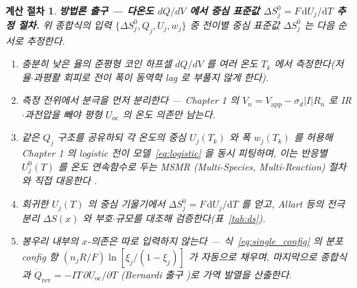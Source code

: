 \documentclass[11pt,a4paper]{article}
\newtheorem*{procedurebox}{계산 절차}
\newcommand{\dd}{\mathrm{d}}
\newcommand{\rev}{\mathrm{rev}}
\newcommand{\oc}{\mathrm{oc}}
\begin{document}
\begin{procedurebox}
\textbf{방법론 출구 — 다온도 $dQ/dV$ 에서 중심 표준값 $\Delta S^0_j=F\,\dd U_j/\dd T$ 추정 절차.} 위 종합식의 입력
$\{\Delta S^0_j,Q_j,U_j,w_j\}$ 중 전이별 중심 표준값 $\Delta S^0_j$ 는 다음 순서로 추정한다.
\begin{enumerate}[leftmargin=1.8em,itemsep=2pt,topsep=2pt]
\item 충분히 낮은 율의 준평형 코인 하프셀 $dQ/dV$ 를 여러 온도 $T_k$ 에서 측정한다(저율$\cdot$과평활 회피로
전이 폭이 동역학 lag 로 부풀지 않게 한다).
\item 측정 전위에서 분극을 먼저 분리한다 — Chapter 1 의 $V_n=V_\mathrm{app}-\sigma_d|I|R_n$ 로 IR$\cdot$과전압을
빼야 \emph{평형} $U_\oc$ 의 온도 의존만 남는다.
\item 같은 $Q_j$ 구조를 공유하되 각 온도의 중심 $U_j(T_k)$ 와 폭 $w_j(T_k)$ 를 허용해 Chapter 1 의 logistic
전이 모델~\eqref{eq:logistic} 을 \emph{동시} 피팅하며, 이는 반응별 $U_j^0(T)$ 를 온도 연속함수로 두는 MSMR
(Multi-Species, Multi-Reaction) 절차와 직접 대응한다 \cite{msmr_partI,msmr_partII}.
\item 회귀한 $U_j(T)$ 의 중심 기울기에서 $\Delta S^0_j=F\,\dd U_j/\dd T$ 를 얻고, Allart 등의 전극 분리
$\Delta S(x)$ \cite{allart2018} 와 부호$\cdot$규모를 대조해 검증한다(표~\ref{tab:ds}).
\item 봉우리 \emph{내부}의 $x$-의존은 따로 입력하지 않는다 — 식~\eqref{eq:single_config} 의 분포 config 항
$(n_jR/F)\ln[\xi_j/(1-\xi_j)]$ 가 자동으로 채우며, 마지막으로 종합식과 $\dot Q_\rev=-IT\,\partial U_\oc/\partial T$
(Bernardi 출구 \cite{bernardi1985})로 가역 발열을 산출한다.
\end{enumerate}
\end{procedurebox}

\end{document}

